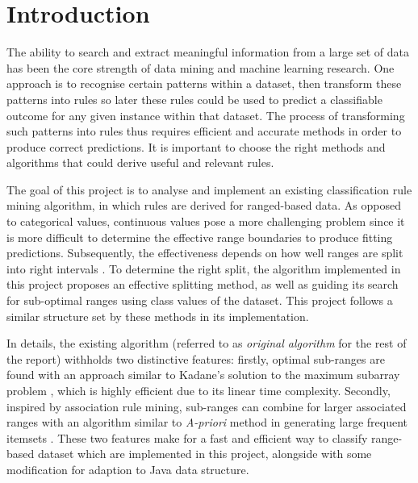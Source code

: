 \chapter{Introduction}

The ability to search and extract meaningful information from a large set of data has been the core strength of data mining and machine learning research. One approach is to recognise certain patterns within a dataset, then transform these patterns into rules so later these rules could be used to predict a classifiable outcome for any given instance within that dataset. The process of transforming such patterns into rules thus requires efficient and accurate methods in order to produce correct predictions. It is important to choose the right methods and algorithms that could derive useful and relevant rules. 

\bigskip

The goal of this project is to analyse and implement an existing classification rule mining algorithm, in which rules are derived for ranged-based data. As opposed to categorical values, continuous values pose a more challenging problem since it is more difficult to determine the effective range boundaries to produce fitting predictions. Subsequently, the effectiveness depends on how well ranges are split into right intervals \cite{srikant}. To determine the right split, the algorithm implemented in this project proposes an effective splitting method, as well as guiding its search for sub-optimal ranges using class values of the dataset. This project follows a similar  structure set by these methods in its implementation.

\bigskip

In details, the existing algorithm (referred to as \textit{original algorithm} for the rest of the report) withholds two distinctive features: firstly, optimal sub-ranges are found with an approach similar to Kadane's solution to the maximum subarray problem \cite{kadane}, which is highly efficient due to its linear time complexity. Secondly, inspired by association rule mining, sub-ranges can combine for larger associated ranges with an algorithm similar to \textit{A-priori} method in generating large frequent itemsets \cite{apriori}. These two features make for a fast and efficient way to classify range-based dataset which are implemented in this project, alongside with some modification for adaption to Java data structure.





